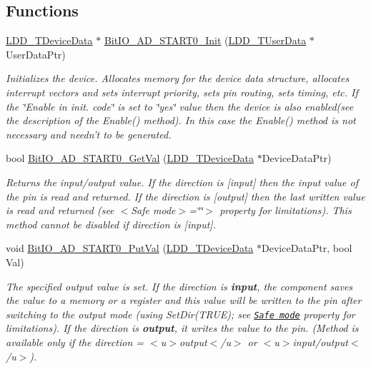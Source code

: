 \subsection*{Functions}
\begin{DoxyCompactItemize}
\item 
\hyperlink{group___p_e___types__module_gac5cf1362f1f0e3a2ce71b1bf2276d091}{L\-D\-D\-\_\-\-T\-Device\-Data} $\ast$ \hyperlink{group___bit_i_o___a_d___s_t_a_r_t0__module_ga17f8eaaf957ef280eef9742e14362f25}{Bit\-I\-O\-\_\-\-A\-D\-\_\-\-S\-T\-A\-R\-T0\-\_\-\-Init} (\hyperlink{group___p_e___types__module_ga0b66a73f87238a782318aa0be7578e35}{L\-D\-D\-\_\-\-T\-User\-Data} $\ast$User\-Data\-Ptr)
\begin{DoxyCompactList}\small\item\em Initializes the device. Allocates memory for the device data structure, allocates interrupt vectors and sets interrupt priority, sets pin routing, sets timing, etc. If the \char`\"{}\-Enable
    in init. code\char`\"{} is set to \char`\"{}yes\char`\"{} value then the device is also enabled(see the description of the Enable() method). In this case the Enable() method is not necessary and needn't to be generated. \end{DoxyCompactList}\item 
bool \hyperlink{group___bit_i_o___a_d___s_t_a_r_t0__module_ga94c582ba5e44181fc6b6b407fb6bccbb}{Bit\-I\-O\-\_\-\-A\-D\-\_\-\-S\-T\-A\-R\-T0\-\_\-\-Get\-Val} (\hyperlink{group___p_e___types__module_gac5cf1362f1f0e3a2ce71b1bf2276d091}{L\-D\-D\-\_\-\-T\-Device\-Data} $\ast$Device\-Data\-Ptr)
\begin{DoxyCompactList}\small\item\em Returns the input/output value. If the direction is \mbox{[}input\mbox{]} then the input value of the pin is read and returned. If the direction is \mbox{[}output\mbox{]} then the last written value is read and returned (see $<$\-Safe mode$>$=\char`\"{}\char`\"{}$>$ property for limitations). This method cannot be disabled if direction is \mbox{[}input\mbox{]}. \end{DoxyCompactList}\item 
void \hyperlink{group___bit_i_o___a_d___s_t_a_r_t0__module_gae8867e9c498da9f6504cac19f66955ee}{Bit\-I\-O\-\_\-\-A\-D\-\_\-\-S\-T\-A\-R\-T0\-\_\-\-Put\-Val} (\hyperlink{group___p_e___types__module_gac5cf1362f1f0e3a2ce71b1bf2276d091}{L\-D\-D\-\_\-\-T\-Device\-Data} $\ast$Device\-Data\-Ptr, bool Val)
\begin{DoxyCompactList}\small\item\em The specified output value is set. If the direction is {\bfseries  input}, the component saves the value to a memory or a register and this value will be written to the pin after switching to the output mode (using {\ttfamily Set\-Dir(\-T\-R\-U\-E)}; see \href{BitIOProperties.html#SafeMode}{\tt Safe mode} property for limitations). If the direction is {\bfseries output}, it writes the value to the pin. (Method is available only if the direction = $<$u$>${\ttfamily output}$<$/u$>$ or $<$u$>${\ttfamily  input/output}$<$/u$>$). \end{DoxyCompactList}\item 

\end{DoxyCompactItemize}
